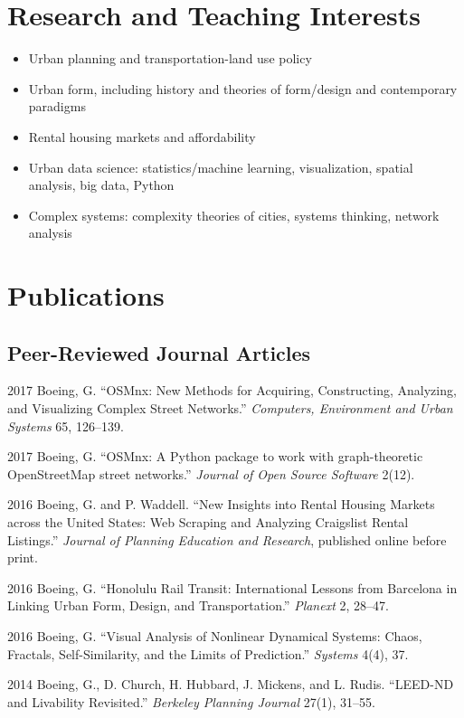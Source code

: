 \documentclass{academiccv}
\begin{document}
\section*{Research and Teaching Interests}

\begin{itemize}
\item Urban planning and transportation-land use policy
\item Urban form, including history and theories of form/design and contemporary paradigms
\item Rental housing markets and affordability
\item Urban data science: statistics/machine learning, visualization, spatial analysis, big data, Python
\item Complex systems: complexity theories of cities, systems thinking, network analysis
\end{itemize}



\section*{Publications}

\subsection*{Peer-Reviewed Journal Articles}

\begin{tablist}

\item[2017] \tab Boeing, G. \enquote{OSMnx: New Methods for Acquiring, Constructing, Analyzing, and Visualizing Complex Street Networks.} \emph{Computers, Environment and Urban Systems} 65, 126--139.

\item[2017] \tab Boeing, G. \enquote{OSMnx: A Python package to work with graph-theoretic OpenStreetMap street networks.} \emph{Journal of Open Source Software} 2(12).

\item[2016] \tab Boeing, G. and P. Waddell. \enquote{New Insights into Rental Housing Markets across the United States: Web Scraping and Analyzing Craigslist Rental Listings.} \emph{Journal of Planning Education and Research}, published online before print.

\item[2016] \tab Boeing, G. \enquote{Honolulu Rail Transit: International Lessons from Barcelona in Linking Urban Form, Design, and Transportation.} \emph{Planext} 2, 28--47.

\item[2016] \tab Boeing, G. \enquote{Visual Analysis of Nonlinear Dynamical Systems: Chaos, Fractals, Self-Similarity, and the Limits of Prediction.} \emph{Systems} 4(4), 37.

\item[2014] \tab Boeing, G., D. Church, H. Hubbard, J. Mickens, and L. Rudis. \enquote{LEED-ND and Livability Revisited.} \emph{Berkeley Planning Journal} 27(1), 31--55.

\end{tablist}
\end{document}

